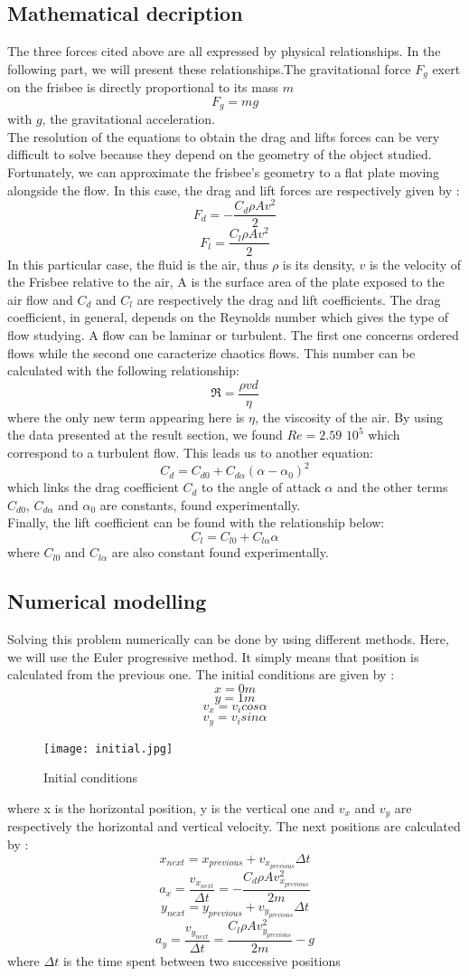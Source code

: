 \documentclass[10pt,a4paper]{report}
\begin{document}
\subsection{Mathematical decription}
The three forces cited above are all expressed by physical relationships. In the following part, we will present these relationships.The gravitational force $F_g$ exert on the frisbee is directly proportional to its mass $m$
\[F_g = m g\]
with $g$, the gravitational acceleration.
\\
The resolution of the equations to obtain the drag and lifts forces can be very difficult to solve because they depend on the geometry of the object studied. Fortunately, we can approximate the frisbee's geometry to a flat plate moving alongside the flow. In this case, the drag and lift forces are respectively given by :
\[F_d = -\frac{C_d \rho A  v^2}{2}\]
\[F_l = \frac{C_l \rho A  v^2}{2}\]
In this particular case, the fluid is the air, thus $\rho$ is its density, $v$ is the velocity of the Frisbee relative to the air, A is the surface area of the plate exposed to the air flow and $C_d$ and $C_l$ are respectively the drag and lift coefficients.
The drag coefficient, in general, depends on the Reynolds number which gives the type of flow studying. A flow can be laminar or turbulent. The first one concerns ordered flows while the second one caracterize chaotics flows. This number can be calculated with the following relationship:
\[\Re = \frac{\rho v d}{\eta}\]
where the only new term appearing here is $\eta$, the viscosity of the air.
By using the data presented at the result section, we found $Re=2.59$ $10^5$ which correspond to a turbulent flow.
This leads us to another equation:
\[C_d = C_{d0} + C_{d\alpha}(\alpha-\alpha_0)^2\]
which links the drag coefficient $C_d$ to the angle of attack $\alpha$ and the other terms $C_{d0}$, $C_{d\alpha}$ and $\alpha_0$ are constants, found experimentally.
\\Finally, the lift coefficient can be found with the relationship below:
\[C_l = C_{l0} + C_{l \alpha} \alpha\]
where $C_{l0}$ and $C_{l\alpha}$ are also constant found experimentally.
\subsection{Numerical modelling}
Solving this problem numerically can be done by using different methods. Here, we will use the Euler progressive method. It simply means that position is calculated from the previous one.
The initial conditions are given by :
\[x = 0 m\]
\[y = 1 m\]
\[v_x = v_i cos\alpha \]
\[v_y = v_i sin\alpha \] 
\begin{figure}[!h]
\centering
\texttt{[image: initial.jpg]}
\caption{Initial conditions}
\label{Initial conditions}
\end{figure}
where x is the horizontal position, y is the vertical one and $v_x$ and $v_y$ are respectively the horizontal and vertical velocity.
The next positions are calculated by :
\[x_{next} = x_{previous} + v_{x_{previous}} \Delta t \]
\[a_x=\frac{v_{x_{next}}}{\Delta t} = -\frac{C_d \rho A  v_{x_{previous}}^2}{2m}\]
\[y_{next} = y_{previous} + v_{y_{previous}} \Delta t \]
\[a_y = \frac{v_{y_{next}}}{\Delta t} = \frac{C_l \rho A  v_{y_{previous}}^2}{2m} - g\]
where $\Delta t$ is the time spent between two successive positions
\end{document}
